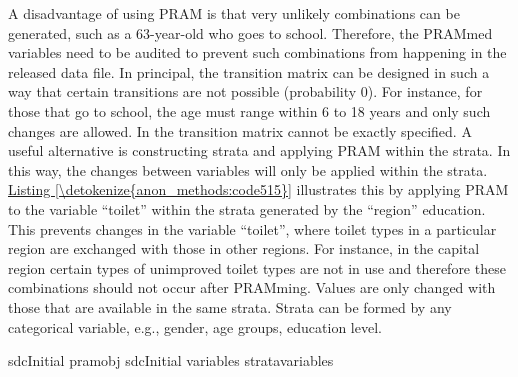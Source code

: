 \documentclass[letterpaper,10pt,english]{sphinxmanual}
\begin{document}
A disadvantage of using PRAM is that very unlikely combinations can be
generated, such as a 63-year-old who goes to school. Therefore, the
PRAMmed variables need to be audited to prevent such combinations from
happening in the released data file. In principal, the transition matrix
can be designed in such a way that certain transitions are not possible
(probability 0). For instance, for those that go to school, the age must
range within 6 to 18 years and only such changes are allowed. In
 the transition matrix cannot be exactly specified. A useful
alternative is constructing strata and applying PRAM within the strata.
In this way, the changes between variables will only be applied within
the strata. \hyperref[\detokenize{anon_methods:code515}]{Listing \ref{\detokenize{anon_methods:code515}}} illustrates this by applying PRAM to the
variable “toilet” within the strata generated by the “region” education.
This prevents changes in the variable “toilet”, where toilet types in a
particular region are exchanged with those in other regions. For
instance, in the capital region certain types of unimproved toilet types
are not in use and therefore these combinations should not occur after
PRAMming. Values are only changed with those that are available in the
same strata. Strata can be formed by any categorical variable, e.g.,
gender, age groups, education level.

\def\sphinxLiteralBlockLabel{\label{\detokenize{anon_methods:code515}}}
%
\begin{sphinxVerbatim}[commandchars=\\\{\},numbers=left,firstnumber=1,stepnumber=1]
sdcInitial  pramobj  sdcInitial variables  
                   strata\PYGZus{}variables  
\end{sphinxVerbatim}
\end{document}
